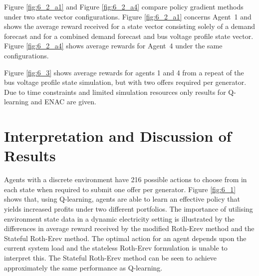 Figure \ref{fig:6_2_a1} and Figure \ref{fig:6_2_a4} compare policy gradient
methods under two state vector configurations.  Figure \ref{fig:6_2_a1} concerns
Agent~1 and shows the average reward received for a state vector consisting
solely of a demand forecast and for a combined demand forecast and bus voltage
profile state vector.  Figure \ref{fig:6_2_a4} shows average rewards for
Agent~4 under the same configurations.


Figure \ref{fig:6_3} shows average rewards for agents 1 and 4 from a repeat of
the bus voltage profile state simulation, but with two offers required per
generator.  Due to time constraints and limited simulation resources only
results for Q-learning and ENAC are given.

\section{Interpretation and Discussion of Results}
\label{sec:discuss}
Agents with a discrete environment have 216 possible actions to choose from in
each state when required to submit one offer per generator.  Figure
\ref{fig:6_1} shows that, using Q-learning, agents are able to learn an
effective policy that yields increased profits under two different portfolios.
The importance of utilising environment state data in a dynamic electricity
setting is illustrated by the differences in average reward received by the
modified Roth-Erev method and the Stateful Roth-Erev method.  The optimal action
for an agent depends upon the current system load and the stateless Roth-Erev
formulation is unable to interpret this.  The Stateful Roth-Erev method can be
seen to achieve approximately the same performance as Q-learning.

